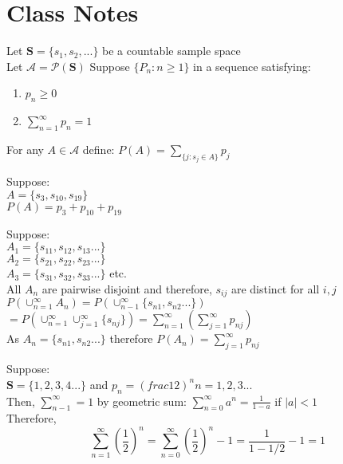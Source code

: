 \documentclass[12pt, oneside, letterpaper]{notes}
\begin{document}
\section{Class Notes}
\begin{myex}
	Let $\textbf{S} = \{s_1, s_2, ...\}$ be a countable sample  space \\
	Let $\mathscr{A} = \mathscr{P}(\textbf{S})$
	Suppose $\{P_n : n \geq 1\} $ in a sequence satisfying:
	\begin{enumerate}
		\item $p_n \geq 0$ 
		\item $\sum_{n=1}^{\infty}p_n = 1$
	\end{enumerate}
	For any $A \in \mathscr{A}$ define: $P(A) = \sum_{\{j: s_j \in A\}} p_j $

\begin{remark}
	Suppose: \\
	$A = \{s_3, s_{10}, s_{19} \}$ \\
	$P(A) = p_3 + p_{10} + p_{19}$ \\
	\vspace{3pt}
	
	\noindent Suppose: \\	
	$A_1 = \{s_{11}, s_{12}, s_{13} ... \}$ \\
	$A_2 = \{s_{21}, s_{22}, s_{23} ... \}$ \\
	$A_3 = \{s_{31}, s_{32}, s_{33} ... \}$ etc.\\
	All $A_n$ are pairwise disjoint and therefore, $s_{ij}$ are distinct
	for all $i,j$ \\
	$P(\cup_{n=1}^{\infty}A_n) = P(\cup_{n-1}^{\infty}\{s_{n1}, s_{n2}...\} )$ \\
	\indent $ = P(\cup_{n=1}^{\infty} \cup_{j=1}^{\infty} \{s_{nj}\}) =
	\sum_{n=1}^{\infty}(\sum_{j=1}^{\infty} p_{nj})  $ \\
	As $A_n = \{s_{n1}, s_{n2} ... \}$ therefore $P(A_n) = 
	\sum_{j=1}^{\infty}p_{nj} $ \\
	\vspace{3pt}

	\noindent Suppose: \\
	$\textbf{S} = \{1,2,3,4 ...\}$ and $p_n = (frac{1}{2})^n n=1,2,3 ...$ \\
	Then, $\sum_{n-1}^{\infty} = 1$ by geometric sum:
	$\sum_{n=0}^{\infty}a^n = \frac{1}{1-a}$ if $|a| < 1 $ \\
	Therefore, $$\sum_{n=1}^{\infty}(\frac{1}{2})^n 
	= \sum_{n=0}^{\infty}(\frac{1}{2})^n-1 = \frac{1}{1-1/2} -1 = 1$$ \\
	\vspace{3pt}


\end{remark}
\end{myex}
\end{document}
